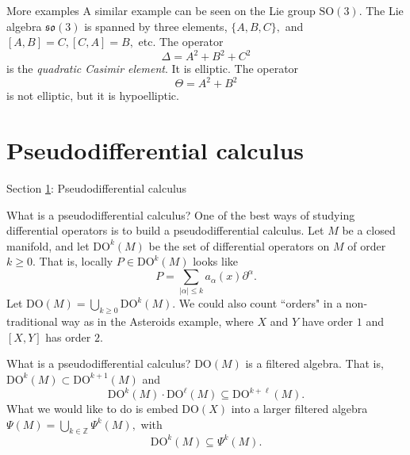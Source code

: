 \documentclass{beamer}
\numberwithin{equation}{section}
\theoremstyle{plain}
\theoremstyle{plain}
\theoremstyle{definition}
\theoremstyle{plain}
\theoremstyle{plain}
\theoremstyle{definition}
\newcommand{\Rl}{\mathbb{R}}
\newcommand{\Itgr}{\mathbb{Z}}
\begin{document}
\begin{frame}{More examples}
  A similar example can be seen on the Lie group $\mathrm{SO}(3).$ The Lie algebra $\mathfrak{so}(3)$
  is spanned by three elements, $\{A,B,C\},$ and $[A,B]=C, [C,A] = B,$ etc.
  \pause
  The operator
  \[
      \Delta = A^2+B^2+C^2
  \]
  is the \emph{quadratic Casimir element}. It is elliptic.
  \pause
  The operator
  \[
    \Theta = A^2+B^2
  \]
  is not elliptic, but it is hypoelliptic.
\end{frame}
% 
% 



\section{Pseudodifferential calculus}\label{psido_section}

\begin{frame}
    \huge{Section \ref{psido_section}: Pseudodifferential calculus}
\end{frame}

\begin{frame}{What is a pseudodifferential calculus?}
  One of the best ways of studying differential operators is to build a pseudodifferential calculus.
  \pause
  Let $M$ be a closed manifold, and let $\mathrm{DO}^k(M)$ be the set of differential operators on $M$
  of order $k\geq 0.$ That is, locally $P \in \mathrm{DO}^k(M)$ looks like
  \[
    P = \sum_{|\alpha|\leq k} a_{\alpha}(x)\partial^{\alpha}.
  \]
  Let $\mathrm{DO}(M) = \bigcup_{k\geq 0} \mathrm{DO}^k(M).$
  \pause
  We could also count ``orders" in a non-traditional way as in the Asteroids example, where $X$ and $Y$ have order $1$ and $[X,Y]$ has order $2.$
\end{frame}

\begin{frame}{What is a pseudodifferential calculus?}
  $\mathrm{DO}(M)$ is a filtered algebra. That is, $\mathrm{DO}^{k}(M)\subset \mathrm{DO}^{k+1}(M)$ and
  \[
    \mathrm{DO}^k(M)\cdot \mathrm{DO}^\ell(M) \subseteq \mathrm{DO}^{k+\ell}(M).
  \]
  What we would like to do is embed $\mathrm{DO}(X)$ into a larger filtered algebra $\Psi(M)=\bigcup_{k\in \Itgr} \Psi^k(M),$ with
  \[
    \mathrm{DO}^k(M) \subseteq \Psi^k(M).
  \]
\end{frame}
\end{document}
